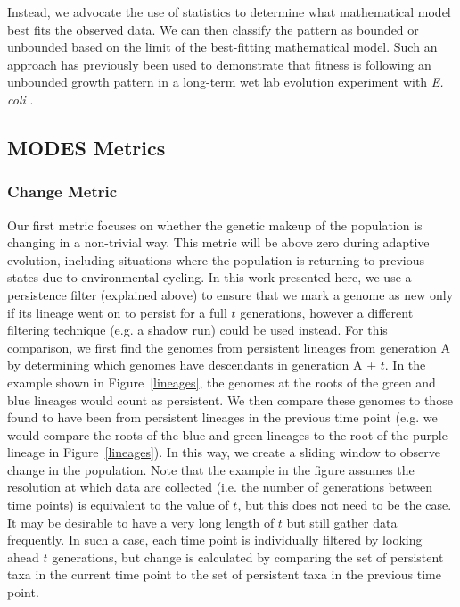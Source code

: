 \documentclass[letterpaper]{article}
\begin{document}
Instead, we advocate the use of statistics to determine what mathematical model best fits the observed data. We can then classify the pattern as bounded or unbounded based on the limit of the best-fitting mathematical model. Such an approach has previously been used to demonstrate that fitness is following an unbounded growth pattern in a long-term wet lab evolution experiment with \textit{E. coli} \citep{wiser_long-term_2013, lenski_sustained_2015}.

\subsection{MODES Metrics}

\subsubsection{Change Metric}
Our first metric focuses on whether the genetic makeup of the population is changing in a non-trivial way. This metric will be above zero %
during adaptive evolution, including situations where the population is returning to previous states due to environmental cycling.
In this work presented here, we use a persistence filter (explained above) to ensure that we mark a genome as new %
only if its lineage 
went on to persist for a
full $t$ generations, however a different filtering technique (e.g. a shadow run) could be used instead. For this comparison, we first find the genomes from persistent lineages from generation A by determining which genomes have descendants in generation A + $t$. In the example shown in Figure~\ref{lineages}, the genomes at the roots of the green and blue lineages would count as persistent. We then compare these genomes to those found to have been from persistent lineages in the previous time point (e.g. we would compare the roots of the blue and green lineages to the root of the purple lineage in Figure~\ref{lineages}). In this way, we create a sliding window to observe change in the population. Note that the example in the figure assumes the resolution at which data are collected (i.e. the number of generations between time points) is equivalent to the value of $t$, but this does not need to be the case. It may be desirable to have a very long length of $t$ but still gather data frequently. In such a case, each time point is individually filtered by looking ahead $t$ generations, but change is calculated by comparing the set of persistent taxa in the current time point to the set of persistent taxa in the previous time point. 
\end{document}
